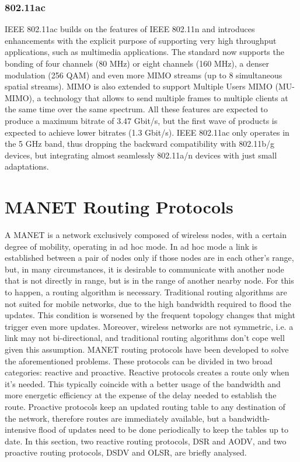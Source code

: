 \subsubsection{802.11ac}

IEEE 802.11ac builds on the features of IEEE 802.11n and introduces enhancements with the explicit purpose of supporting very high throughput applications, such as multimedia applications. The standard now supports the bonding of four channels (80 MHz) or eight channels (160 MHz), a denser modulation (256 QAM) and even more MIMO streams (up to 8 simultaneous spatial streams). MIMO is also extended to support Multiple Users MIMO (MU-MIMO), a technology that allows to send multiple frames to multiple clients at the same time over the same spectrum. All these features are expected to produce a maximum bitrate of 3.47 Gbit/s, but the first wave of products is expected to achieve lower bitrates (1.3 Gbit/s). IEEE 802.11ac only operates in the 5 GHz band, thus dropping the backward compatibility with 802.11b/g devices, but integrating almost seamlessly 802.11a/n devices with just small adaptations.

\section{MANET Routing Protocols}

A \gls{MANET} is a network exclusively composed of wireless nodes, with a certain degree of mobility, operating in ad hoc mode. In ad hoc mode a link is established between a pair of nodes only if those nodes are in each other's range, but, in many circumstances, it is desirable to communicate with another node that is not directly in range, but is in the range of another nearby node. For this to happen, a routing algorithm is necessary. Traditional routing algorithms are not suited for mobile networks, due to the high bandwidth required to flood the updates. This condition is worsened by the frequent topology changes that might trigger even more updates. Moreover, wireless networks are not symmetric, i.e. a link may not bi-directional, and traditional routing algorithms don't cope well given this assumption. \gls{MANET} routing protocols have been developed to solve the aforementioned problems. These protocols can be divided in two broad categories: reactive and proactive. Reactive protocols creates a route only when it's needed. This typically coincide with a better usage of the bandwidth and more energetic efficiency at the expense of the delay needed to establish the route. Proactive protocols keep an updated routing table to any destination of the network, therefore routes are immediately available, but a bandwidth-intensive flood of updates need to be done periodically to keep the tables up to date. In this section, two reactive routing protocols, \gls{DSR} and \gls{AODV}, and two proactive routing protocols, \gls{DSDV} and \gls{OLSR}, are briefly analysed.

